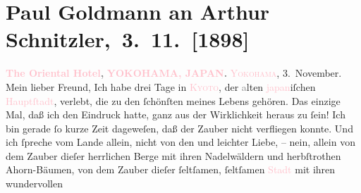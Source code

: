 

               \section[ Paul Goldmann an Arthur Schnitzler, 3. 11. {[}1898{]}]{Paul Goldmann an Arthur Schnitzler, 3. 11. {[}1898{]}}\nopagebreak{}\rehead{ }\normalsize\beginnumbering{} \toendnotes[C]{\smallbreak\pagebreak[2]} 
\toendnotes[C]{\smallbreak}\pstart
           \noindent{}{\pb}\textcolor{gray}{\textbf{\textcolor{pink}{The Oriental Hotel}{}\ledrightnote{\textcolor{pink}{The Oriental Hotel}},}}\pend
           \pstart
           \textcolor{gray}{\textbf{\textcolor{pink}{YOKOHAMA,
                     JAPAN}{}\ledrightnote{\textcolor{pink}{Yokohama}}.}}\pend
           \pstart
           \raggedleft{}\textsc{\textcolor{pink}{Yokohama}{}\ledrightnote{\textcolor{pink}{Yokohama}}}, 3. November.\pend
           \pstart\center{}Mein lieber Freund,\pend\pstart
           Ich habe drei Tage in \textsc{\textcolor{pink}{Kyoto}{}\ledrightnote{\textcolor{pink}{Kyoto}}}, der \textcolor{gray}{a}lten \textcolor{pink}{japan}{}\ledrightnote{\textcolor{pink}{Japan}}iſchen
                  \textcolor{pink}{Hauptſtadt}{}, verlebt, die
               zu den ſchönſten meines Lebens gehören. Das einzige Mal, daß ich den Eindruck hatte,
               ganz aus der Wirklichkeit heraus zu ſein! Ich bin gerade ſo kurze Zeit dageweſen, daß
               der Zauber nicht verfliegen konnte. Und ich ſpreche vom Lande allein,  nicht von den \label{K_L02864-3v}\label{K_L02864-3h}
               und leichter Liebe, – nein, allein von dem Zauber dieſer herrlichen Berge mit ihren
               Nadelwäldern und herbſtrothen Ahorn-Bäumen, von dem {\pb}Zauber dieſer ſeltſamen, ſeltſamen \textcolor{pink}{Stadt}{} mit ihren wundervollen \strikeout{\textcolor{gray}{Tempeln und ihr}}
